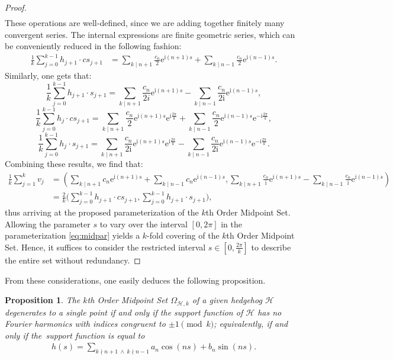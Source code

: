 \documentclass{amsart}
\newtheorem{prop}[thm]{Proposition}
\theoremstyle{definition}
\numberwithin{equation}{section}
\newcommand{\e}{\mathrm{e}}
\renewcommand{\i}{\mathrm{i}}
\begin{document}
\begin{proof}
\begin{align*}
\end{align*}
These operations are well-defined, since we are adding together finitely many convergent series. The internal expressions are finite geometric series, which can be conveniently reduced in the following fashion:
\begin{align*}
   \frac{1}{k}\sum_{j=0}^{k-1}h_{j+1}\cdot cs_{j+1} &=\sum_{ k \mid n+1}\frac{c_n}{2}{\e}^{\i (n+1)s} + \sum_{ k \mid n-1}\frac{c_n}{2}{\e}^{\i (n-1)s}.
\end{align*}
Similarly, one gets that:
$$ \frac{1}{k}\sum_{j=0}^{k-1}h_{j+1}\cdot s_{j+1} = \sum_{ k \mid n+1}\frac{c_n}{2i}{\e}^{\i (n+1)s} - \sum_{ k \mid n-1}\frac{c_n}{2\i }{\e}^{\i (n-1)s},$$
$$ \frac{1}{k} \sum_{j=0}^{k-1}h_j\cdot cs_{j+1} = \sum_{ k \mid n+1}\frac{c_n}{2}{\e}^{\i (n+1)s}{\e}^{\i \frac{2\pi}{k}} + \sum_{ k \mid n-1}\frac{c_n}{2}{\e}^{\i (n-1)s}{\e}^{-\i \frac{2\pi}{k}},$$
$$  \frac{1}{k}\sum_{j=0}^{k-1}h_j\cdot s_{j+1} = \sum_{ k \mid n+1}\frac{c_n}{2\i }{\e}^{\i (n+1)s}{\e}^{\i \frac{2\pi}{k}} - \sum_{ k \mid n-1}\frac{c_n}{2\i}{\e}^{\i (n-1)s}{\e}^{-\i \frac{2\pi}{k}}.$$ Combining these results, we find that:
\begin{align*}
    \frac{1}{k}\sum_{j=1}^{k}v_j &=\left(\sum_{ k \mid n+1}c_n{\e}^{\i (n+1)s} + \sum_{ k \mid n-1}c_n{\e}^{\i (n-1)s},\sum_{ k \mid n+1}\frac{c_n}{\i }{\e}^{\i (n+1)s} - \sum_{ k \mid n-1}\frac{c_n}{\i }{\e}^{\i (n-1)s}\right)\\
    &=\frac{2}{k}\Bigg(\sum_{j=0}^{k-1}h_{j+1}\cdot cs_{j+1},\sum_{j=0}^{k-1}h_{j+1}\cdot s_{j+1}\Bigg),
\end{align*} 
thus arriving at the proposed parameterization of the $k$th Order Midpoint Set.
Allowing the parameter $s$ to vary over the interval $[0, 2\pi]$ in the parameterization \eqref{eq:midpar} yields a $k$-fold covering of the $k$th Order Midpoint Set. Hence, it suffices to consider the restricted interval $s \in \left[0, \tfrac{2\pi}{k} \right]$ to describe the entire set without redundancy.
 \end{proof}   

From these considerations, one easily deduces the following proposition.
\begin{prop}\label{singmid}
    The $k$th Order Midpoint Set $\Omega_{\mathcal{H},k}$ of a given hedgehog $\mathcal{H}$ degenerates to a single point if and only if the support function of $\mathcal{H}$ has no Fourier harmonics with indices congruent to $\pm 1\pmod{k}$; equivalently, if and only if the~support function is equal to
    \begin{align}
    \label{eq:middlepointsupport}h(s) = \sum_{ k\nmid n+1\ \land \ k\nmid n-1} a_n\cos(ns) + b_n\sin(ns).
    \end{align}
\end{prop}
\end{document}
